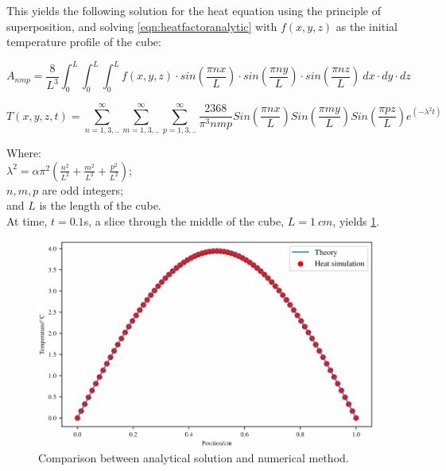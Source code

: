 This yields the following solution for the heat equation using the principle of superposition, and solving \cref{eqn:heatfactoranalytic} with $f(x,y,z)$ as the initial temperature profile of the cube:

\begin{equation}
A_{nmp}=\frac{8}{L^3}\int_0^L\int_0^L\int_0^L f(x,y,z)\cdot sin(\frac{\pi n x}{L})\cdot sin(\frac{\pi n y}{L})\cdot sin(\frac{\pi n z}{L})\ dx\cdot dy\cdot dz
\label{eqn:heatfactoranalytic}
\end{equation}

\begin{equation}
T(x,y,z,t)=\sum^\infty_{n=1,3,..}\sum^\infty_{m=1,3,..}\sum^\infty_{p=1,3,..}\frac{2368}{\pi^3nmp}Sin(\frac{\pi n x}{L})Sin(\frac{\pi m y}{L})Sin(\frac{\pi p z}{L})e^{(-\lambda^2t)}
\end{equation}

\noindent Where:\\
	\indent $\lambda^2=\alpha\pi^2(\tfrac{n^2}{L^2}+\tfrac{m^2}{L^2}+\tfrac{p^2}{L^2})$;\\
	\indent $n,m,p$ are odd integers;\\
	\indent and $L$ is the length of the cube.\\
	
At time, $t=0.1$s, a slice through the middle of the cube, $L=1~cm$,  yields \cref{fig:validation-heat}.

\begin{figure}	
\vspace{-10pt}
	\centering
	\includegraphics[width=\columnwidth]{./ablation/images/validation.pdf}
	\caption{Comparison between analytical solution and numerical method.}
	\label{fig:validation-heat}
	\vspace{-10pt}
\end{figure}	

